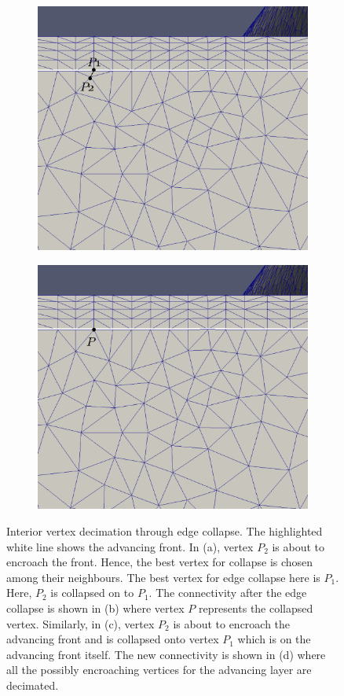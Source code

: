 \begin{figure}[hbt!]
\begin{subfigure}{.5\textwidth}
  \centering
  \includegraphics[width=.9\linewidth, trim={0 5cm 0  0}, clip]{img/m2/interior-vert-collapse/cc3.eps}
  \caption{}
  \label{cc3}
\end{subfigure}%
\begin{subfigure}{.5\textwidth}
  \centering
  \includegraphics[width=.9\linewidth, trim={0 5cm 0  0}, clip]{img/m2/interior-vert-collapse/cc4.eps}
  \caption{}
  \label{cc4}
\end{subfigure}
\caption[Interior vertex decimation through edge collapse.]{Interior vertex decimation through edge collapse. The highlighted white line shows the advancing front. In (a), vertex $P_2$ is about to encroach the front. Hence, the best vertex for collapse is chosen among their neighbours. The best vertex for edge collapse here is $P_1$. Here, $P_2$ is collapsed on to $P_1$. The connectivity after the edge collapse is shown in (b) where vertex $P$ represents the collapsed vertex. Similarly, in (c), vertex $P_2$ is about to encroach the advancing front and is collapsed onto vertex $P_1$ which is on the advancing front itself. The new connectivity is shown in (d) where all the possibly encroaching vertices for the advancing layer are decimated.}

\end{figure}
